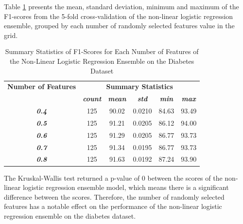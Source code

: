 \documentclass[10pt, conference]{IEEEtran}
\begin{document}
Table \ref{table: D_feature_nonlinear_performance_metrics} presents the mean, standard deviation, minimum and maximum of the
F1-scores from the 5-fold cross-validation of the non-linear logistic regression ensemble, grouped by each number of randomly selected
features value in the grid.
\begin{table}[H]
    \caption{Summary Statistics of F1-Scores for Each Number of Features of the Non-Linear Logistic Regression Ensemble on the Diabetes Dataset}
    \begin{center}
        \begin{tabular}{|c||c|c|c|c|c|}
            \hline
            \textbf{Number of Features}&\multicolumn{5}{|c|}{\textbf{Summary Statistics}} \\
            \cline{2-6}
                                &\textbf{\textit{count}} & \textbf{\textit{mean}} & \textbf{\textit{std}} & \textbf{\textit{min}} & \textbf{\textit{max}}\\
            \hline
            \textbf{\textit{0.4}} & 125 & 90.02 & 0.0210 & 84.63 & 93.49 \\
            \textbf{\textit{0.5}} & 125 & 91.21 & 0.0205 & 86.12 & 94.00 \\
            \textbf{\textit{0.6}} & 125 & 91.29 & 0.0205 & 86.77 & 93.73 \\
            \textbf{\textit{0.7}} & 125 & 91.34 & 0.0195 & 86.77 & 93.73 \\
            \textbf{\textit{0.8}} & 125 & 91.63 & 0.0192 & 87.24 & 93.90 \\
            \hline
        \end{tabular}
    \end{center}
    \label{table: D_feature_nonlinear_performance_metrics}
\end{table}
The Kruskal-Wallis test returned a p-value of 0 between the scores of the non-linear logistic regression ensemble model,
which means there is a significant difference between the scores. Therefore, the number of randomly selected
features has a notable effect on the performance of the non-linear logistic regression ensemble on the diabetes dataset.
\end{document}
